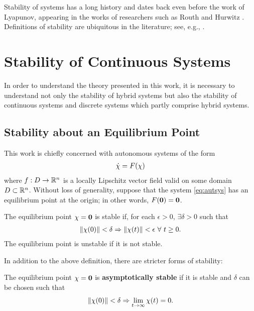 Stability of systems has a long history and dates back even before the work of
Lyapunov, appearing in the works of researchers such as Routh \cite{Routh1877}
and Hurwitz \cite{Hurwitz1895}.
%
Definitions of stability are ubiquitous in the literature; see, e.g.,
\cite{Khalil2002,Teschl2012,Vidyasagar1993}.


\section{Stability of Continuous Systems}

In order to understand the theory presented in this work, it is necessary to
understand not only the stability of hybrid systems but also the stability of
continuous systems and discrete systems which partly comprise hybrid systems.
%

\subsection{Stability about an Equilibrium Point}
This work is chiefly concerned with autonomous systems of the form
\begin{align}
  \label{eq:autsys}
  {\dot {\chi}} = F(\chi)
\end{align}
where $f : D \to \mathbb{R}^{n}$ is a locally Lipschitz vector field valid on some domain
$D \subset \mathbb{R}^{n}$.
%
Without loss of generality, suppose that the system \eqref{eq:autsys} has an equilibrium point at the
origin;
%
in other words, $F({\mathbf 0}) = {\mathbf 0}$.
%
\begin{definition}
  The equilibrium point $\chi = {\mathbf 0}$ is stable if, for each $\epsilon > 0$,
  $\exists \delta > 0$ such that
  \begin{align*}
    \|\chi(0)\| < \delta \Rightarrow \|\chi(t)\| < \epsilon \ \forall \ t
    \geq 0.
  \end{align*}
  The equilibrium point is unstable if it is not stable.
\end{definition}

In addition to the above definition, there are stricter forms of stability:
\begin{definition}
  The equilibrium point $\chi = {\mathbf 0}$ is {\bf asymptotically stable} if it is
  stable and $\delta$ can be chosen such that
  \begin{align*}
    \|\chi(0)\| < \delta \Rightarrow \lim_{t \to \infty} \chi(t) = 0.
  \end{align*}
\end{definition}

